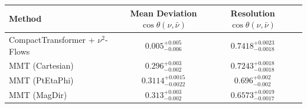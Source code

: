     \begin{tabular}{lccc}
        \toprule
        Method & Mean Deviation $\cos\theta(\nu, \bar{\nu})$ & Resolution $\cos\theta(\nu, \bar{\nu})$ \\
        \midrule
        CompactTransformer + $\nu^2$-Flows & $0.005^{+0.005}_{-0.006}$ & $0.7418^{+0.0023}_{-0.0018}$ \\
        MMT (Cartesian) & $0.296^{+0.003}_{-0.002}$ & $0.7243^{+0.0018}_{-0.0018}$ \\
        MMT (PtEtaPhi) & $0.3114^{+0.0015}_{-0.0022}$ & $0.696^{+0.002}_{-0.002}$ \\
        MMT (MagDir) & $0.313^{+0.003}_{-0.002}$ & $0.6573^{+0.0019}_{-0.0017}$ \\
        \bottomrule
    \end{tabular}